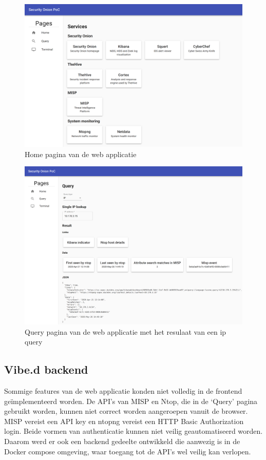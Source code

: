 \documentclass[a4paper,12pt]{report}
\begin{document}
\begin{figure}[H]
  \centering
  \includegraphics[width=\textwidth]{so-manager-home}
  \caption{Home pagina van de web applicatie}
  \label{fig:so-manager-home}
\end{figure}

\begin{figure}[H]
  \centering
  \includegraphics[width=\textwidth]{so-manager-query}
  \caption{Query pagina van de web applicatie met het resulaat van een ip query}
  \label{fig:so-manager-query}
\end{figure}

\subsection{Vibe.d backend}
Sommige features van de web applicatie konden niet volledig in de frontend geïmplementeerd worden.
De API's van MISP en Ntop, die in de `Query' pagina gebruikt worden, kunnen niet correct worden aangeroepen vanuit de browser.
MISP vereist een API key en ntopng vereist een HTTP Basic Authorization login.
Beide vormen van authenticatie kunnen niet veilig geautomatiseerd worden.
Daarom werd er ook een backend gedeelte ontwikkeld die aanwezig is in de Docker compose omgeving, waar toegang tot de API's wel veilig kan verlopen.
\end{document}
